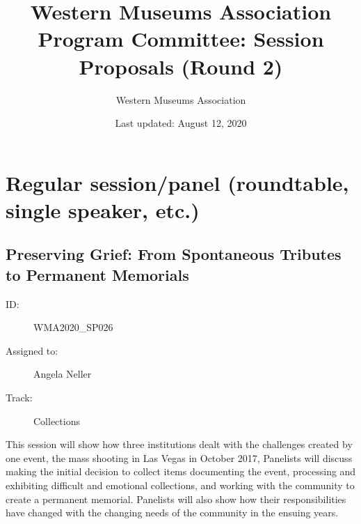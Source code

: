 \documentclass{report}
\title{ Western Museums Association Program Committee: Session Proposals (Round 2)}
\date{ Last updated: August 12, 2020}
\author{Western Museums Association}
\begin{document}
  \maketitle
  \newpage
  \tableofcontents
  \newpage
  
    \newpage
    \chapter*{ Regular session/panel (roundtable, single speaker, etc.) }

      
        
          \newpage
          \section{ Preserving Grief: From Spontaneous Tributes to Permanent Memorials }
            \begin{description}
              \item [ID:]
              WMA2020\_SP026

              \item [Assigned to:]Angela Neller~
                \item [Track:]Collections~
              \end{description}

              This session will show how three institutions dealt with the challenges created by one event, the mass shooting in Las Vegas in October 2017, Panelists will discuss making the initial decision to collect items documenting the event, processing and exhibiting  difficult and emotional collections, and working with the community to create a permanent memorial. Panelists will also show how their responsibilities have changed with the changing needs of the community in the ensuing years.
\end{document}
